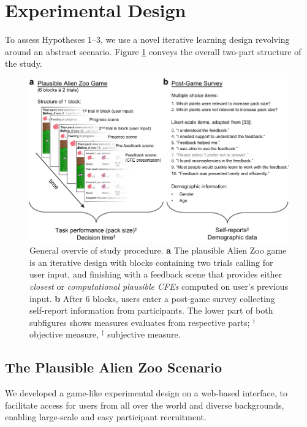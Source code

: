 \section{Experimental Design}\label{sec:experimental-design}

To assess Hypotheses 1--3, we use a novel iterative learning design revolving around an abstract scenario. Figure \ref{fig:StudyStructure} conveys the overall two-part structure of the study.

\begin{figure}
   \centering
   \includegraphics[width=\textwidth]{./media/FigureStudyStructure.pdf}
   \caption{General overvie of study procedure. \textbf{a} The plausible Alien Zoo game is an iterative design with blocks containing two trials calling for user input, and finishing with a feedback scene that provides either \textit{closest} or \textit{computational plausible \glspl{CFE}} computed on user's previous input. \textbf{b} After 6 blocks, users enter a post-game survey collecting self-report information from participants. The lower part of both subfigures shows measures evaluates from respective parts; $^\dag$ objective measure, $^\ddag$ subjective measure.}
   \label{fig:StudyStructure}
 \end{figure}

\subsection{The Plausible Alien Zoo Scenario}

We developed a game-like experimental design on a web-based interface, to facilitate access for users from all over the world and diverse backgrounds, enabling large-scale and easy participant recruitment.

